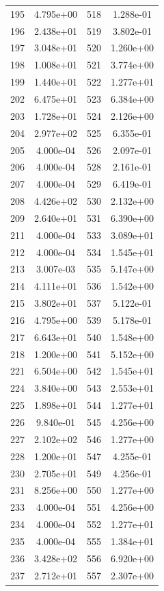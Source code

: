 \documentclass[12pt]{article}
\begin{document}
\begin{longtable}{@{}cccc@{}}
195 & 4.795e+00 & 518 & 1.288e-01 \\
196 & 2.438e+01 & 519 & 3.802e-01 \\
197 & 3.048e+01 & 520 & 1.260e+00 \\
198 & 1.008e+01 & 521 & 3.774e+00 \\
199 & 1.440e+01 & 522 & 1.277e+01 \\
202 & 6.475e+01 & 523 & 6.384e+00 \\
203 & 1.728e+01 & 524 & 2.126e+00 \\
204 & 2.977e+02 & 525 & 6.355e-01 \\
205 & 4.000e-04 & 526 & 2.097e-01 \\
206 & 4.000e-04 & 528 & 2.161e-01 \\
207 & 4.000e-04 & 529 & 6.419e-01 \\
208 & 4.426e+02 & 530 & 2.132e+00 \\
209 & 2.640e+01 & 531 & 6.390e+00 \\
211 & 4.000e-04 & 533 & 3.089e+01 \\
212 & 4.000e-04 & 534 & 1.545e+01 \\
213 & 3.007e-03 & 535 & 5.147e+00 \\
214 & 4.111e+01 & 536 & 1.542e+00 \\
215 & 3.802e+01 & 537 & 5.122e-01 \\
216 & 4.795e+00 & 539 & 5.178e-01 \\
217 & 6.643e+01 & 540 & 1.548e+00 \\
218 & 1.200e+00 & 541 & 5.152e+00 \\
221 & 6.504e+00 & 542 & 1.545e+01 \\
224 & 3.840e+00 & 543 & 2.553e+01 \\
225 & 1.898e+01 & 544 & 1.277e+01 \\
226 & 9.840e-01 & 545 & 4.256e+00 \\
227 & 2.102e+02 & 546 & 1.277e+00 \\
228 & 1.200e+01 & 547 & 4.255e-01 \\
230 & 2.705e+01 & 549 & 4.256e-01 \\
231 & 8.256e+00 & 550 & 1.277e+00 \\
233 & 4.000e-04 & 551 & 4.256e+00 \\
234 & 4.000e-04 & 552 & 1.277e+01 \\
235 & 4.000e-04 & 555 & 1.384e+01 \\
236 & 3.428e+02 & 556 & 6.920e+00 \\
237 & 2.712e+01 & 557 & 2.307e+00 \\

\end{longtable}
\end{document}
